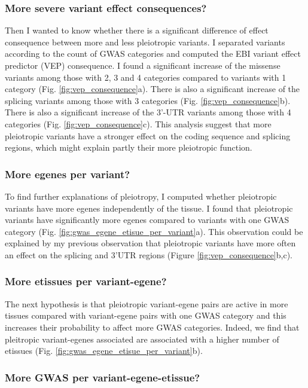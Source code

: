 \subsubsection*{More severe variant effect consequences?}

Then I wanted to know whether there is a significant difference of effect consequence between more and less pleiotropic variants.
%
I separated variants according to the count of GWAS categories and computed the EBI variant effect predictor (VEP) consequence.
%
I found a significant increase of the missense variants among those with 2, 3 and 4 categories compared to variants with 1 category (Fig. \ref{fig:vep_consequence}a).
%
There is also a significant increase of the splicing variants among those with 3 categories (Fig. \ref{fig:vep_consequence}b).
%
There is also a significant increase of the 3'-UTR variants among those with 4 categories (Fig. \ref{fig:vep_consequence}c).
%
This analysis suggest that more pleiotropic variants have a stronger effect on the coding sequence and splicing regions, which might explain partly their more pleiotropic function.

\subsubsection*{More egenes per variant?}

To find further explanations of pleiotropy, I computed whether pleiotropic variants have more egenes independently of the tissue.
%
I found that pleiotropic variants have significantly more egenes compared to variants with one GWAS category (Fig. \ref{fig:gwas_egene_etisue_per_variant}a).
%
This observation could be explained by my previous observation that pleiotropic variants have more often an effect on the splicing and 3'UTR regions (Figure \ref{fig:vep_consequence}b,c).

\subsubsection*{More etissues per variant-egene?}

The next hypothesis is that pleiotropic variant-egene pairs are active in more tissues compared with variant-egene pairs with one GWAS category and this increases their probability to affect more GWAS categories.
%
Indeed, we find that pleitropic variant-egenes associated are associated with a higher number of etissues (Fig. \ref{fig:gwas_egene_etisue_per_variant}b).

\subsubsection*{More GWAS per variant-egene-etissue?}

